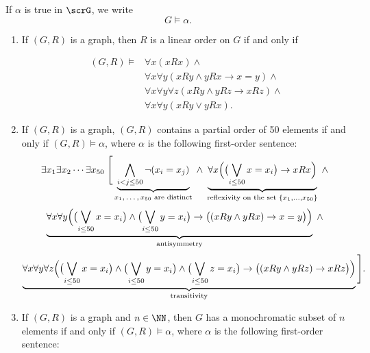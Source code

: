 \begin{notation}
  If $\alpha$ is true in $\scrG$, we write
  \[
    G\models \alpha.
  \]
\end{notation}

\begin{examples} \hfill
  \begin{enumerate}
  \item
    If $(G,R)$ is a graph, then $R$ is a linear order on $G$ if and only if

    \begin{align*}
    (G,R)\models & \forall x (x R x) \land                                                   \\
                 & \forall x \forall y (x R y \wedge y R x \rightarrow x = y)\land           \\
                 & \forall x \forall y \forall z (x R y \wedge y R z \rightarrow x R z)\land \\
                 & \forall x \forall y (x R y \vee y R x).
    \end{align*}
  \item
    If $(G,R)$ is a graph, $(G,R)$ contains a partial order of 50 elements  if and only if $(G,R)\models\alpha$, where $\alpha$ is the following first-order sentence:
    \[
      \exists x_1 \exists x_2 \cdots \exists x_{50} \;
      \Bigg[
        \underbrace{\bigwedge_{i < j\le 50} \neg(x_i = x_j)}_{\text{$x_1,\dots, x_{50}$ are distinct}}
        \;\wedge\;
        \underbrace{
          \forall x \Bigl(
          \bigl( \bigvee_{i \le 50} x = x_i \bigr)
          \rightarrow x R x
          \Bigr)
        }_{\text{reflexivity on the set } \{x_1,\ldots,x_{50}\}}
        \;\wedge\;
        \]
        \[
          \underbrace{
            \forall x \forall y \Bigl(
            \bigl( \bigvee_{i \le 50} x = x_i \bigr)
            \wedge
            \bigl( \bigvee_{i \le 50} y = x_i \bigr)
            \rightarrow
            \bigl( (x R y \wedge y R x) \rightarrow x = y \bigr)
            \Bigr)
          }_{\text{antisymmetry}}
          \;\wedge\;
        \]
        \[
        \underbrace{
          \forall x \forall y \forall z \Bigl(
          \bigl( \bigvee_{i \le 50} x = x_i \bigr)
          \wedge
          \bigl( \bigvee_{i \le 50} y = x_i \bigr)
          \wedge
          \bigl( \bigvee_{i \le 50} z = x_i \bigr)
          \rightarrow
          \bigl( (x R y \wedge y R z) \rightarrow x R z \bigr)
          \Bigr)
        }_{\text{transitivity}}
        \Bigg].
    \]
  \item
    If $(G,R)$ is a graph and $n\in\NN$, then $G$  has a monochromatic subset of $n$ elements if and only if $(G,R)\models\alpha$, where $\alpha$ is the following first-order sentence:

\end{enumerate}
\end{examples}

